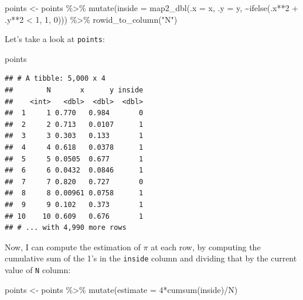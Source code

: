 \documentclass[
]{article}
\newenvironment{Shaded}{\begin{snugshade}}{\end{snugshade}}
\newcommand{\AttributeTok}[1]{\textcolor[rgb]{0.77,0.63,0.00}{#1}}
\newcommand{\DecValTok}[1]{\textcolor[rgb]{0.00,0.00,0.81}{#1}}
\newcommand{\FunctionTok}[1]{\textcolor[rgb]{0.00,0.00,0.00}{#1}}
\newcommand{\NormalTok}[1]{#1}
\newcommand{\OtherTok}[1]{\textcolor[rgb]{0.56,0.35,0.01}{#1}}
\newcommand{\SpecialCharTok}[1]{\textcolor[rgb]{0.00,0.00,0.00}{#1}}
\newcommand{\StringTok}[1]{\textcolor[rgb]{0.31,0.60,0.02}{#1}}
\begin{document}
\begin{Shaded}
\begin{Highlighting}[]
\NormalTok{points }\OtherTok{\textless{}{-}}\NormalTok{ points }\SpecialCharTok{\%\textgreater{}\%}
    \FunctionTok{mutate}\NormalTok{(}\AttributeTok{inside =} \FunctionTok{map2\_dbl}\NormalTok{(}\AttributeTok{.x =}\NormalTok{ x, }\AttributeTok{.y =}\NormalTok{ y, }\SpecialCharTok{\textasciitilde{}}\FunctionTok{ifelse}\NormalTok{(.x}\SpecialCharTok{**}\DecValTok{2} \SpecialCharTok{+}\NormalTok{ .y}\SpecialCharTok{**}\DecValTok{2} \SpecialCharTok{\textless{}} \DecValTok{1}\NormalTok{, }\DecValTok{1}\NormalTok{, }\DecValTok{0}\NormalTok{))) }\SpecialCharTok{\%\textgreater{}\%}
    \FunctionTok{rowid\_to\_column}\NormalTok{(}\StringTok{"N"}\NormalTok{)}
\end{Highlighting}
\end{Shaded}

Let's take a look at \texttt{points}:

\begin{Shaded}
\begin{Highlighting}[]
\NormalTok{points}
\end{Highlighting}
\end{Shaded}

\begin{verbatim}
## # A tibble: 5,000 x 4
##        N       x      y inside
##    <int>   <dbl>  <dbl>  <dbl>
##  1     1 0.770   0.984       0
##  2     2 0.713   0.0107      1
##  3     3 0.303   0.133       1
##  4     4 0.618   0.0378      1
##  5     5 0.0505  0.677       1
##  6     6 0.0432  0.0846      1
##  7     7 0.820   0.727       0
##  8     8 0.00961 0.0758      1
##  9     9 0.102   0.373       1
## 10    10 0.609   0.676       1
## # ... with 4,990 more rows
\end{verbatim}

Now, I can compute the estimation
of \(\pi\) at each row, by computing the cumulative sum of the 1's in the \texttt{inside} column and dividing
that by the current value of \texttt{N} column:

\begin{Shaded}
\begin{Highlighting}[]
\NormalTok{points }\OtherTok{\textless{}{-}}\NormalTok{ points }\SpecialCharTok{\%\textgreater{}\%}
    \FunctionTok{mutate}\NormalTok{(}\AttributeTok{estimate =} \DecValTok{4}\SpecialCharTok{*}\FunctionTok{cumsum}\NormalTok{(inside)}\SpecialCharTok{/}\NormalTok{N)}
\end{Highlighting}
\end{Shaded}
\end{document}
